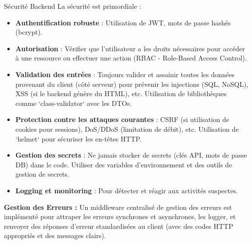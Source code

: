 \documentclass[11pt,a4paper]{report}
\begin{document}
\begin{tipbox}{Sécurité Backend}
La sécurité est primordiale :
\begin{itemize}
    \item \textbf{Authentification robuste} : Utilisation de JWT, mots de passe hashés (bcrypt).
    \item \textbf{Autorisation} : Vérifier que l'utilisateur a les droits nécessaires pour accéder à une ressource ou effectuer une action (RBAC - Role-Based Access Control).
    \item \textbf{Validation des entrées} : Toujours valider et assainir toutes les données provenant du client (côté serveur) pour prévenir les injections (SQL, NoSQL), XSS (si le backend génère du HTML), etc. Utilisation de bibliothèques comme `class-validator` avec les DTOs.
    \item \textbf{Protection contre les attaques courantes} : CSRF (si utilisation de cookies pour sessions), DoS/DDoS (limitation de débit), etc. Utilisation de `helmet` pour sécuriser les en-têtes HTTP.
    \item \textbf{Gestion des secrets} : Ne jamais stocker de secrets (clés API, mots de passe DB) dans le code. Utiliser des variables d'environnement et des outils de gestion de secrets.
    \item \textbf{Logging et monitoring} : Pour détecter et réagir aux activités suspectes.
\end{itemize}
\end{tipbox}

\textbf{Gestion des Erreurs :} Un middleware centralisé de gestion des erreurs est implémenté pour attraper les erreurs synchrones et asynchrones, les logger, et renvoyer des réponses d'erreur standardisées au client (avec des codes HTTP appropriés et des messages clairs).
\end{document}
